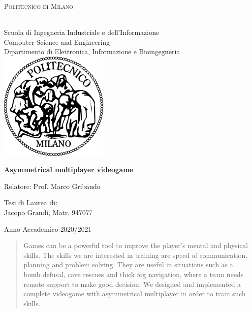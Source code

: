 \documentclass{article}
\begin{document}
\setlength{\parindent}{0in}

\begin{titlepage}
\begin{center}

\begin{large} 
\textsc{Politecnico di Milano}
\end{large}
\\
Scuola di Ingegneria Industriale e dell’Informazione \\
Computer Science and Engineering \\
Dipartimento di Elettronica, Informazione e Bioingegneria \\

\vspace{0.8cm}
\includegraphics[width=0.4\textwidth]{poli}

\vspace{3cm}

\begin{Large}
\textbf{Asymmetrical multiplayer videogame}
\end{Large}

\vspace{3cm}

\begin{flushleft}
Relatore:
Prof. Marco Gribaudo
\end{flushleft}

\vspace{1cm}

\begin{flushright}
Tesi di Laurea di: \\
Jacopo Grandi, Matr. 947077
\end{flushright}

\vfill
Anno Accademico 2020/2021
\end{center}
\end{titlepage}

\clearpage

\begin{abstract}
Games can be a powerful tool to improve the player's mental and physical skills. The skills we are interested in training are speed of communication, planning and problem solving. They are useful in situations such as a bomb defusal, cave rescues and thick fog navigation, where a team needs remote support to make good decision. We designed and implemented a complete videogame with asymmetrical multiplayer in order to train such skills.
\end{abstract}
\end{document}

